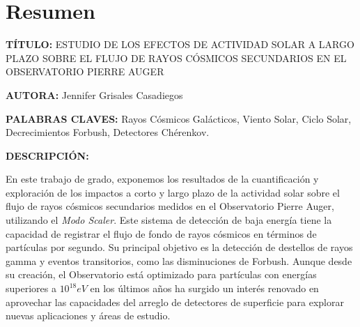 \newpage
\chapter*{Resumen}
\label{sec:resum}
\footnotesize{
\noindent\textbf{TÍTULO:}  ESTUDIO DE LOS EFECTOS DE ACTIVIDAD SOLAR A LARGO PLAZO
SOBRE EL FLUJO DE RAYOS CÓSMICOS SECUNDARIOS EN EL OBSERVATORIO PIERRE AUGER

\noindent\textbf{AUTORA:} Jennifer Grisales Casadiegos

\noindent\textbf{PALABRAS CLAVES: } Rayos Cósmicos Galácticos, Viento Solar, Ciclo Solar, Decrecimientos Forbush, Detectores Chérenkov.

\noindent \textbf{DESCRIPCIÓN: }

En este trabajo de grado, exponemos los resultados de la cuantificación y exploración de los impactos a corto y largo plazo de la actividad solar sobre el flujo de rayos cósmicos secundarios medidos en el Observatorio Pierre Auger, utilizando el \textit{Modo Scaler}. Este sistema de detección de baja energía tiene la capacidad de registrar el flujo de fondo de rayos cósmicos en términos de partículas por segundo. Su principal objetivo es la detección de destellos de rayos gamma y eventos transitorios, como las disminuciones de Forbush. Aunque desde su creación, el Observatorio está optimizado para partículas con energías superiores a $10^{18}eV$ en los últimos años ha surgido un interés renovado en aprovechar las capacidades del arreglo de detectores de superficie para explorar nuevas aplicaciones y áreas de estudio.

}
